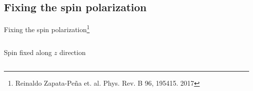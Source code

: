 \documentclass{beamer}
\begin{document}
\begin{frame}
{\begin{columns}
\begin{figure}[h!]
\begin{tikzpicture}
\end{tikzpicture}
\end{figure}


\end{columns}

}

\end{frame}



\subsection{Fixing the spin polarization}

\begin{frame}

{\Large Fixing the spin polarization\footnote[frame]
{\tiny Reinaldo Zapata-Pe\~na et. al. Phys. Rev. B 96, 195415. 2017}}

{\small

\begin{columns}


\begin{center}
{\large Spin fixed along $z$ direction}
\end{center}

\vspace{-5mm}

\begin{figure}[h!]
\end{figure}
\end{columns}}
\end{frame}
\end{document}
